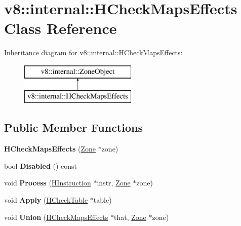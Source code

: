 \hypertarget{classv8_1_1internal_1_1_h_check_maps_effects}{}\section{v8\+:\+:internal\+:\+:H\+Check\+Maps\+Effects Class Reference}
\label{classv8_1_1internal_1_1_h_check_maps_effects}
Inheritance diagram for v8\+:\+:internal\+:\+:H\+Check\+Maps\+Effects\+:\begin{figure}[H]
\begin{center}
\leavevmode
\includegraphics[height=2.000000cm]{classv8_1_1internal_1_1_h_check_maps_effects}
\end{center}
\end{figure}
\subsection*{Public Member Functions}
\begin{DoxyCompactItemize}
\item 
{\bfseries H\+Check\+Maps\+Effects} (\hyperlink{classv8_1_1internal_1_1_zone}{Zone} $\ast$zone)\hypertarget{classv8_1_1internal_1_1_h_check_maps_effects_a4f3f3d6d4c24e321208ba9bd4ecd1cd6}{}\label{classv8_1_1internal_1_1_h_check_maps_effects_a4f3f3d6d4c24e321208ba9bd4ecd1cd6}

\item 
bool {\bfseries Disabled} () const \hypertarget{classv8_1_1internal_1_1_h_check_maps_effects_a12d7a62b36691d9b019bab8e3d5f52fb}{}\label{classv8_1_1internal_1_1_h_check_maps_effects_a12d7a62b36691d9b019bab8e3d5f52fb}

\item 
void {\bfseries Process} (\hyperlink{classv8_1_1internal_1_1_h_instruction}{H\+Instruction} $\ast$instr, \hyperlink{classv8_1_1internal_1_1_zone}{Zone} $\ast$zone)\hypertarget{classv8_1_1internal_1_1_h_check_maps_effects_adc100710ba231361ae11018ee8778c57}{}\label{classv8_1_1internal_1_1_h_check_maps_effects_adc100710ba231361ae11018ee8778c57}

\item 
void {\bfseries Apply} (\hyperlink{classv8_1_1internal_1_1_h_check_table}{H\+Check\+Table} $\ast$table)\hypertarget{classv8_1_1internal_1_1_h_check_maps_effects_a8bde6a324d6de6da382f802a7c3fdaad}{}\label{classv8_1_1internal_1_1_h_check_maps_effects_a8bde6a324d6de6da382f802a7c3fdaad}

\item 
void {\bfseries Union} (\hyperlink{classv8_1_1internal_1_1_h_check_maps_effects}{H\+Check\+Maps\+Effects} $\ast$that, \hyperlink{classv8_1_1internal_1_1_zone}{Zone} $\ast$zone)\hypertarget{classv8_1_1internal_1_1_h_check_maps_effects_a39980a8d8c314c5f903f3074f7561ff5}{}\label{classv8_1_1internal_1_1_h_check_maps_effects_a39980a8d8c314c5f903f3074f7561ff5}

\end{DoxyCompactItemize}
